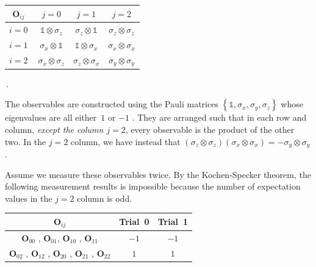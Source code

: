 \documentclass[english,reprint, aps, prl,superscriptaddress, showpacs,
showkeys, longbibliography, amsmath, amssymb, floatfix]{revtex4-1}
\theoremstyle{plain}
\theoremstyle{definition}
\begin{document}
{{\renewcommand{\arraystretch}{2}%
\begin{center} 
\begin{tabular}{r|@{\quad}c@{\quad}|@{\quad}c@{\quad}|@{\quad}c@{\quad}|} 
$\mathbf{O}_{ij}$~ & $j=0$ & $j=1$ & $j=2$ \\ 
\hline  
$i=0~$ & $\mathbb{1}\otimes\sigma_{z}$  & $\sigma_{z}\otimes\mathbb{1}$  & $\sigma_{z}\otimes\sigma_{z}$ \tabularnewline 
\hline  
$i=1~$ & $\sigma_{x}\otimes\mathbb{1}$  & $\mathbb{1}\otimes\sigma_{x}$  & $\sigma_{x}\otimes\sigma_{x}$ \tabularnewline 
\hline  
$i=2~$ & $\sigma_{x}\otimes\sigma_{z}$  & $\sigma_{z}\otimes\sigma_{x}$  & $\sigma_{y}\otimes\sigma_{y}$ \tabularnewline 
\hline  
\end{tabular}\,.
\par\end{center} 
}

\noindent The observables are constructed using the Pauli matrices
$\left\{ \mathbb{1},\sigma_{x},\sigma_{y},\sigma_{z}\right\} $ whose
eigenvalues are all either~$1$ or $-1$ \cite{Redhead1987-REDINA,544199,Griffiths2003,Jaeger2007,Mermin2007}.
They are arranged such that in each row and column, \emph{except the
column $j=2$}, every observable is the product of the other two.
In the $j=2$ column, we have instead that $\left(\sigma_{z}\otimes\sigma_{z}\right)\left(\sigma_{x}\otimes\sigma_{x}\right)=-\sigma_{y}\otimes\sigma_{y}$.

Assume we measure these observables twice. By the Kochen-Specker theorem,
the following measurement results is impossible because the number
of expectation values in the $j=2$ column is odd.
\begin{center}
\begin{tabular}{ccc}
\toprule 
\addlinespace
$\mathbf{O}_{ij}$  & Trial~0 & Trial~1\tabularnewline
\midrule
\midrule 
\addlinespace
$\mathbf{O}_{00}$ , $\mathbf{O}_{01}$, $\mathbf{O}_{10}$ , $\mathbf{O}_{11}$  & $-1$ & $-1$\tabularnewline
\midrule 
\addlinespace
$\mathbf{O}_{02}$ , $\mathbf{O}_{12}$ , $\mathbf{O}_{20}$ , $\mathbf{O}_{21}$
, $\mathbf{O}_{22}$  & $1$ & $1$\tabularnewline
\bottomrule
\end{tabular}
\par\end{center}

}
\end{document}
